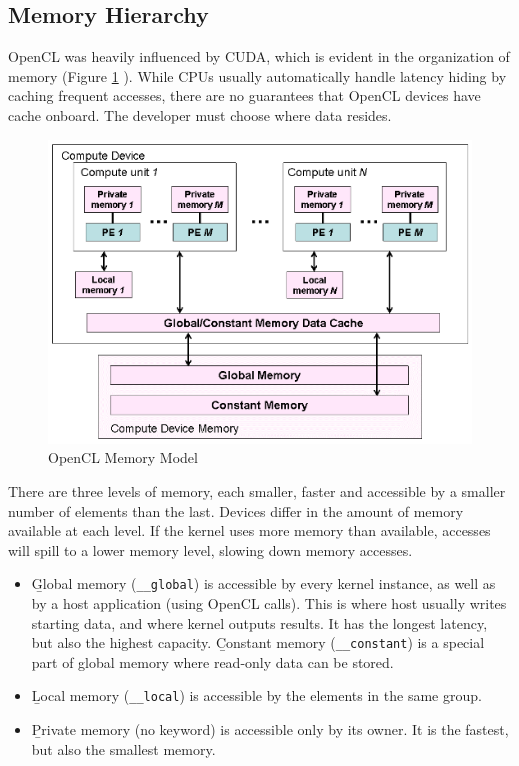 \subsection{Memory Hierarchy}
OpenCL was heavily influenced by CUDA, which is evident in the organization of memory (Figure \ref{fig:openclmemory} \cite{munshi2009opencl}). While CPUs usually automatically handle latency hiding by caching frequent accesses, there are no guarantees that OpenCL devices have cache onboard. The developer must choose where data resides.

\begin{figure}[h]
    \includegraphics[width=\linewidth]{Figures/memory.png}
    \caption{OpenCL Memory Model}
    \label{fig:openclmemory}
\end{figure}

\noindent There are three levels of memory, each smaller, faster and accessible by a smaller number of elements than the last. Devices differ in the amount of memory available at each level. If the kernel uses more memory than available, accesses will spill to a lower memory level, slowing down memory accesses.
\begin{itemize}
    \item \b{Global memory} (\texttt{\_\_global}) is accessible by every kernel instance, as well as by a host application (using OpenCL calls). This is where host usually writes starting data, and where kernel outputs results. It has the longest latency, but also the highest capacity. \b{Constant memory} (\texttt{\_\_constant}) is a special part of global memory where read-only data can be stored.
    \item \b{Local memory} (\texttt{\_\_local}) is accessible by the elements in the same group.
    \item \b{Private memory} (no keyword) is accessible only by its owner. It is the fastest, but also the smallest memory.
\end{itemize}

